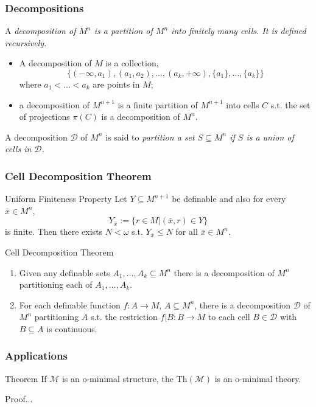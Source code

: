 \begin{frame}[c]\frametitle{Decompositions}
    
	A \em decomposition \em of $M^n$ is a partition of $M^n$ into finitely many cells. It is defined recursively.

	\begin{itemize}
		\item A decomposition of $M$ is a collection,
		$$\{  (-\infty,a_1),(a_1,a_2),\ldots,(a_k,+\infty),\{a_1\},\ldots,\{a_k\} \}$$
		where $a_1<\ldots<a_k$ are points in $M$;
		\item a decomposition of $M^{n+1}$ is a finite partition of $M^{n+1}$ into cells $C$ s.t. the set of projections $\pi(C)$ is a decomposition of $M^n$.
	\end{itemize}

	A decomposition $\mathcal{D}$ of $M^n$ is said to \em partition \em a set $S \subseteq M^n$ if $S$ is a union of cells in $\mathcal{D}$.

\end{frame}

\begin{frame}[c]\frametitle{Cell Decomposition Theorem}
    
	\begin{beamerboxesrounded}[shadow=true]{Uniform Finiteness Property}
		Let $Y \subseteq M^{n+1}$ be definable and also for every $\bar{x} \in M^n$, 
		$$Y_{\bar{x}}:= \{  r \in M | (\bar{x},r) \in Y \}$$ is finite.
		Then there exists $N<\omega$ s.t. $Y_{\bar{x}} \leq N$ for all $\bar{x} \in M^n$.
	\end{beamerboxesrounded}

	\begin{beamerboxesrounded}[shadow=true]{Cell Decomposition Theorem}
		\begin{enumerate}
			\item Given any definable sets $A_1,\ldots,A_k\subseteq M^n$ there is a decomposition of $M^n$ partitioning each of $A_1,\ldots,A_k$.
			\item For each definable function $f:A \to M$, $A \subseteq M^n$, there is a decomposition $\mathcal{D}$ of $M^n$ partitioning $A$ s.t. the restriction $f|B:B\to M$ to each cell $B \in \mathcal{D}$ with $B\subseteq A$ is continuous.
		\end{enumerate}
	\end{beamerboxesrounded}

\end{frame}

\begin{frame}[c]\frametitle{Applications}
    
	\begin{beamerboxesrounded}[shadow=true]{Theorem}
		If $\mathcal{M}$ is an o-minimal structure, the $\text{Th}(\mathcal{M})$ is an o-minimal theory.
	\end{beamerboxesrounded}
	Proof...

\end{frame}

